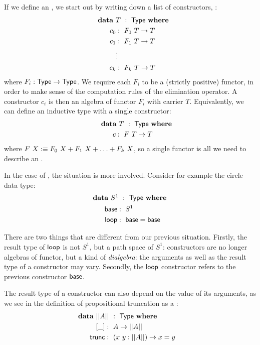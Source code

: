 \documentclass[a4paper,10pt]{report}
\begin{document}
If we define an \oit, we start out by writing down
a list of constructors, \eg:
%
\begin{alignat*}{2}
  &\rlap{$\data\ T\ :\ \Type\ \where$} \\
  &&\ \ c_0  &:\ F_0\ T \to T \\
  &&\ \ c_1  &:\ F_1\ T \to T \\
  &&\ \      &\vdots \\
  &&\ \ c_k  &:\ F_k\ T \to T
\end{alignat*}
%
where $F_i : \mathsf{Type} \to \mathsf{Type}$. We require each $F_i$ to be a (strictly
positive) functor, in order to make sense of the computation rules of
the elimination operator. A constructor $c_i$ is then an algebra of
functor $F_i$ with carrier $T$. Equivalently, we can define an
inductive type with a single constructor:
%
\begin{alignat*}{2}
  &\rlap{$\data\ T\ :\ \Type\ \where$} \\
  &&\ \ c &:\ F\ T \to T 
\end{alignat*}
%
where $F\ X :\equiv F_0\ X + F_1\ X + \hdots + F_k\ X$, so a single
functor is all we need to describe an \oit.

In the case of \hits, the situation is more involved. Consider for
example the circle data type:
%
\begin{alignat*}{2}
  &\rlap{$\data\ S^1\ :\ \Type\ \where$} \\
  &&\ \ \base     &:\ S^1 \\
  &&\ \ \loopcstr &:\ \base = \base
\end{alignat*}

There are two things that are different from our previous
situation. Firstly, the result type of $\mathsf{loop}$ is not $S^1$, but a path
space of $S^1$: constructors are no longer algebras of functor, but a
kind of \emph{dialgebra}: the arguments as well as the result type of
a constructor may vary. Secondly, the $\mathsf{loop}$ constructor refers to the
previous constructor $\mathsf{base}$.

The result type of a constructor can also depend on the value of its
arguments, as we see in the definition of propositional truncation as
a \hit:
%
\begin{alignat*}{2}
  &\rlap{$\data\ || A ||\ :\ \Type\ \where$} \\
  &&\ \ [\_]   &:\ A \to || A || \\
  &&\ \ \trunc &:\ (x\ y : || A ||) \to x = y
\end{alignat*}
\end{document}
